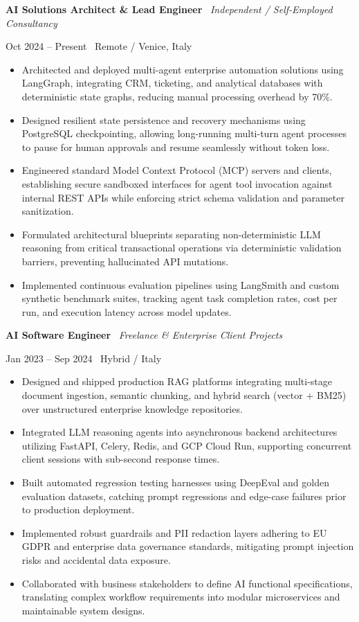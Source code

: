 \documentclass[a4paper,10pt]{article}
\newcommand{\role}[4]{%
  \vspace{2pt}\noindent
  \begin{minipage}[t]{0.70\textwidth}\raggedright\textbf{#1} \textbullet\ \textit{#3}\end{minipage}%
  \hfill
  \begin{minipage}[t]{0.28\textwidth}\raggedleft\footnotesize\color{gray}#2 \textbullet\ #4\end{minipage}%
  \vspace{1pt}%
}
\begin{document}
\role{AI Solutions Architect \& Lead Engineer}{Oct 2024 -- Present}{Independent / Self-Employed Consultancy}{Remote / Venice, Italy}
\begin{itemize}
  \item Architected and deployed multi-agent enterprise automation solutions using LangGraph, integrating CRM, ticketing, and analytical databases with deterministic state graphs, reducing manual processing overhead by 70\%.
  \item Designed resilient state persistence and recovery mechanisms using PostgreSQL checkpointing, allowing long-running multi-turn agent processes to pause for human approvals and resume seamlessly without token loss.
  \item Engineered standard Model Context Protocol (MCP) servers and clients, establishing secure sandboxed interfaces for agent tool invocation against internal REST APIs while enforcing strict schema validation and parameter sanitization.
  \item Formulated architectural blueprints separating non-deterministic LLM reasoning from critical transactional operations via deterministic validation barriers, preventing hallucinated API mutations.
  \item Implemented continuous evaluation pipelines using LangSmith and custom synthetic benchmark suites, tracking agent task completion rates, cost per run, and execution latency across model updates.
\end{itemize}

\role{AI Software Engineer}{Jan 2023 -- Sep 2024}{Freelance \& Enterprise Client Projects}{Hybrid / Italy}
\begin{itemize}
  \item Designed and shipped production RAG platforms integrating multi-stage document ingestion, semantic chunking, and hybrid search (vector + BM25) over unstructured enterprise knowledge repositories.
  \item Integrated LLM reasoning agents into asynchronous backend architectures utilizing FastAPI, Celery, Redis, and GCP Cloud Run, supporting concurrent client sessions with sub-second response times.
  \item Built automated regression testing harnesses using DeepEval and golden evaluation datasets, catching prompt regressions and edge-case failures prior to production deployment.
  \item Implemented robust guardrails and PII redaction layers adhering to EU GDPR and enterprise data governance standards, mitigating prompt injection risks and accidental data exposure.
  \item Collaborated with business stakeholders to define AI functional specifications, translating complex workflow requirements into modular microservices and maintainable system designs.
\end{itemize}
\end{document}
